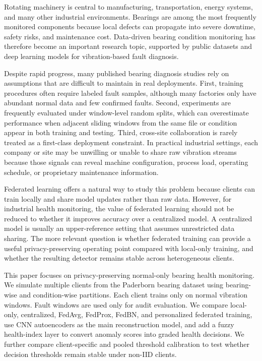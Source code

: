 \documentclass[11pt]{article}
\begin{document}
Rotating machinery is central to manufacturing, transportation, energy systems, and many other industrial environments. Bearings are among the most frequently monitored components because local defects can propagate into severe downtime, safety risks, and maintenance cost. Data-driven bearing condition monitoring has therefore become an important research topic, supported by public datasets and deep learning models for vibration-based fault diagnosis.

Despite rapid progress, many published bearing diagnosis studies rely on assumptions that are difficult to maintain in real deployments. First, training procedures often require labeled fault samples, although many factories only have abundant normal data and few confirmed faults. Second, experiments are frequently evaluated under window-level random splits, which can overestimate performance when adjacent sliding windows from the same file or condition appear in both training and testing. Third, cross-site collaboration is rarely treated as a first-class deployment constraint. In practical industrial settings, each company or site may be unwilling or unable to share raw vibration streams because those signals can reveal machine configuration, process load, operating schedule, or proprietary maintenance information.

Federated learning offers a natural way to study this problem because clients can train locally and share model updates rather than raw data. However, for industrial health monitoring, the value of federated learning should not be reduced to whether it improves accuracy over a centralized model. A centralized model is usually an upper-reference setting that assumes unrestricted data sharing. The more relevant question is whether federated training can provide a useful privacy-preserving operating point compared with local-only training, and whether the resulting detector remains stable across heterogeneous clients.

This paper focuses on privacy-preserving normal-only bearing health monitoring. We simulate multiple clients from the Paderborn bearing dataset using bearing-wise and condition-wise partitions. Each client trains only on normal vibration windows. Fault windows are used only for audit evaluation. We compare local-only, centralized, FedAvg, FedProx, FedBN, and personalized federated training, use CNN autoencoders as the main reconstruction model, and add a fuzzy health-index layer to convert anomaly scores into graded health decisions. We further compare client-specific and pooled threshold calibration to test whether decision thresholds remain stable under non-IID clients.
\end{document}
